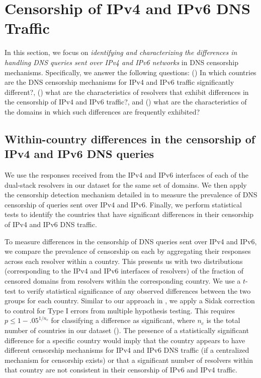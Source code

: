 \section{Censorship of IPv4 and IPv6 DNS Traffic}
\label{sec:infrastructure}

 In this section, we focus on {\it identifying and
characterizing the differences in handling DNS queries sent over IPv4 and IPv6
networks} in DNS censorship mechanisms. 
%
Specifically, we answer the following questions:
%
() In which countries are the DNS censorship
mechanisms for IPv4 and IPv6 traffic significantly different?,
%
() what are the characteristics of resolvers
that exhibit differences in the censorship of IPv4 and IPv6 traffic?, and
%
() what are the characteristics of the domains
in which such differences are frequently exhibited?

\subsection{Within-country differences in the censorship of IPv4 and IPv6 DNS
queries} \label{sec:infrastructure:country}

We use the responses received from the IPv4 and IPv6 interfaces of each of the
dual-stack resolvers in our dataset for the same set of domains. We then apply
the censorship detection mechanism detailed in  to
measure the prevalence of DNS censorship of queries sent over IPv4 and IPv6.
Finally, we perform statistical tests to identify the countries that have
significant differences in their censorship of IPv4 and IPv6 DNS traffic.

To measure differences in the censorship of DNS queries sent over IPv4 and
IPv6, we compare the prevalence of censorship on each by aggregating their
responses across each resolver within a country. This presents us with two
distributions (corresponding to the IPv4 and IPv6 interfaces of resolvers) of
the fraction of censored domains from resolvers within the corresponding
country.
%
We use a $t$-test to verify statistical significance of any observed
differences between the two groups for each country. Similar to our approach in
, we apply a Sidak correction to control for Type I errors
from multiple hypothesis testing. 
%
This requires $p \leq 1-{.05}^{1/n_{c}}$ for classifying a difference as
significant, where $n_c$ is the total number of countries in our dataset
(). 
%
The presence of a statistically significant difference for a specific country
would imply that the country appears to have different censorship mechanisms
for IPv4 and IPv6 DNS traffic (if a centralized mechanism for censorship
exists) or that a significant number of resolvers within that country are not
consistent in their censorship of IPv6 and IPv4 traffic.

